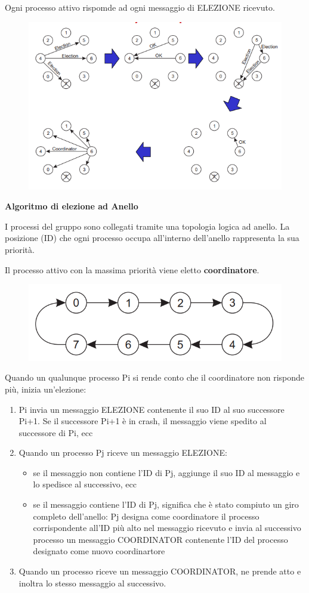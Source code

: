 \documentclass{article}
\begin{document}
Ogni processo attivo rispomde ad ogni messaggio di ELEZIONE ricevuto.

\begin{figure}[htbp]
    \centering
    \includegraphics[width=0.70\columnwidth]{imgs/bully.PNG}
\end{figure}

\vspace{5mm}
\textbf{Algoritmo di elezione ad Anello}

\vspace{3mm}
I processi del gruppo sono collegati tramite una topologia logica ad anello. La posizione (ID) che ogni processo occupa all'interno dell'anello rappresenta
la sua priorità.

Il processo attivo con la massima priorità viene eletto \textbf{coordinatore}.

\begin{figure}[htbp]
    \centering
    \includegraphics[width=0.50\columnwidth]{imgs/el_anello.PNG}
\end{figure}

Quando un qualunque processo Pi si rende conto che il coordinatore non risponde più, inizia un'elezione:
\begin{enumerate}
    \item Pi invia un messaggio ELEZIONE contenente il suo ID al suo successore Pi+1. Se il successore Pi+1 è in crash, il messaggio viene spedito al successore di Pi, ecc
    \item Quando un processo Pj riceve un messaggio ELEZIONE:
    \begin{itemize}
        \item se il messaggio non contiene l'ID di Pj, aggiunge il suo ID al messaggio e lo spedisce al successivo, ecc
        \item se il messaggio contiene l'ID di Pj, significa che è stato compiuto un giro completo dell'anello: Pj designa come coordinatore il processo corrispondente
        all'ID più alto nel messaggio ricevuto e invia al successivo processo un messaggio COORDINATOR contenente l'ID del processo designato come nuovo coordinartore
    \end{itemize}
    \item Quando un processo riceve un messaggio COORDINATOR, ne prende atto e inoltra lo stesso messaggio al successivo.
\end{enumerate}
\end{document}
